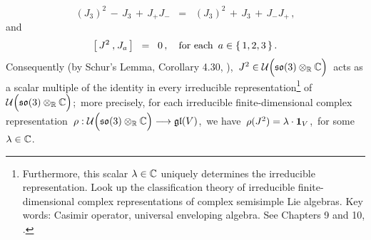 \begin{proposition}
\begin{enumerate}
\begin{equation*}
		(J_{3})^{2} \,-\, J_{3} \,+\, J_{+}J_{-}
	\;\; =\;\;
		(J_{3})^{2} \,+\, J_{3} \,+\, J_{-}J_{+}\,,
	\end{equation*}
	and
	\begin{equation*}
	\left[\,J^{2}\,\overset{{\color{white}1}}{,}\,J_{a}\,\right]
	\;\; = \;\;
		0\,,
	\quad
	\textnormal{for each \,$a \in \{\,1,2,3\,\}$}\,.
	\end{equation*}
	Consequently (by Schur's Lemma, Corollary 4.30, \cite{Hall2015}), 
	\,$J^{2} \in \mathcal{U}\!\left(\so(3) \overset{{\color{white}.}}{\otimes_{\Re}} \C\right)$\,
	acts as a scalar multiple of the identity in every irreducible
	representation\footnote{Furthermore, this scalar $\lambda \in \mathbb{C}$ uniquely determines
	the irreducible representation.
	Look up the classification theory of irreducible finite-dimensional complex representations
	of complex semisimple Lie algebras.
	Key words: Casimir operator, universal enveloping algebra. See Chapters 9 and 10, \cite{Hall2015}.}
	of \,$\mathcal{U}\!\left(\so(3) \overset{{\color{white}.}}{\otimes_{\Re}} \C\right)$;\,
	more precisely, for each irreducible finite-dimensional complex representation
	\,$\rho : \mathcal{U}\!\left(\so(3) \overset{{\color{white}.}}{\otimes_{\Re}} \C\right) \longrightarrow \gl(V)$,\,
	we have \,$\rho(J^{2}) = \lambda \cdot \textnormal{\textbf{1}}_{V}$,\,
	for some \,$\lambda \in \mathbb{C}$.
\end{enumerate}
\end{proposition}



